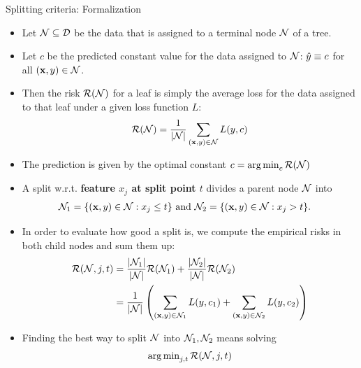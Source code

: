 \begin{vbframe}{Splitting criteria: Formalization}

\begin{itemize}
\item Let $\mathcal{N} \subseteq \mathcal{D}$ be the data that is assigned to a terminal node $\mathcal{N}$ of a tree.
\item Let $c$ be the predicted constant value for the data assigned to $\mathcal{N}$: $\hat{y} \equiv c$ for all $\left(\mathbf{x}, y\right) \in \mathcal{N}$.
\item Then the risk $\mathcal{R}(\mathcal{N})$ for a leaf is simply the average loss for the data assigned to that leaf under a given loss function $L$:
  $$\mathcal{R}(\mathcal{N}) = \frac{1}{|\mathcal{N}|} \sum\limits_{(\mathbf{x}, y) \in \mathcal{N}} L(y, c)$$
\item The prediction is given by the optimal constant $c = \operatorname{arg\,min}_c \mathcal{R}(\mathcal{N})$
\end{itemize}

\framebreak

\begin{itemize}
\item A split w.r.t. \textbf{feature $x_j$ at split point $t$} divides a parent node $\mathcal{N}$ into 
  \begin{align*}
    \mathcal{N}_1 &= \{ (\mathbf{x}, y) \in \mathcal{N}: x_j \leq t \} \text{ and } \mathcal{N}_2 = \{ (\mathbf{x}, y) \in \mathcal{N}: x_j > t \}.
  \end{align*}
\item   
  In order to evaluate how good a split is, we compute the empirical risks
  in both child nodes and sum them up:
     \begin{align*}
      \mathcal{R}(\mathcal{N}, j, t) &= \frac{|\mathcal{N}_1|}{|\mathcal{N}|} \mathcal{R}(\mathcal{N}_1) + \frac{|\mathcal{N}_2|}{|\mathcal{N}|} \mathcal{R}(\mathcal{N}_2) \\
                  &= \frac{1}{|\mathcal{N}|}\left(\sum\limits_{(\mathbf{x},y) \in \mathcal{N}_1} L(y, c_1) + \sum\limits_{(\mathbf{x},y) \in \mathcal{N}_2} L(y, c_2)\right)
      \end{align*}
  \item Finding the best way to split $\mathcal{N}$ into $\mathcal{N}_1, \mathcal{N}_2$ means solving
  $$\operatorname{arg\,min}_{j, t} \mathcal{R}(\mathcal{N}, j, t)$$
\end{itemize}
\end{vbframe}

